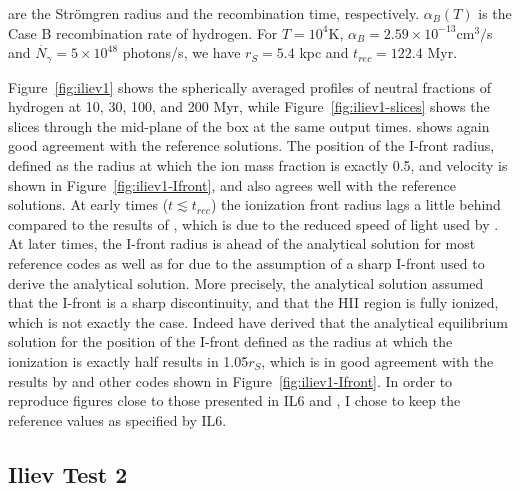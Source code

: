 are the Str\"omgren radius and the recombination time, respectively.
$\alpha_B(T)$ is the Case B recombination rate of hydrogen. For $T = 10^4$K, $\alpha_B =
2.59 \times 10^{-13}$cm$^3/$s and $\dot{N_\gamma} = 5 \times 10^{48}$ photons/s, we have $r_S =
5.4$ kpc and $t_{rec} = 122.4$ Myr.

Figure~\ref{fig:iliev1} shows the spherically averaged profiles of neutral fractions of hydrogen at
10, 30, 100, and 200 Myr, while Figure~\ref{fig:iliev1-slices} shows the slices through the
mid-plane of the box at the same output times. \GEARRT shows again good agreement with the reference
solutions. The position of the I-front radius, defined as the radius at which the ion mass fraction
is exactly 0.5, and velocity is shown in Figure~\ref{fig:iliev1-Ifront}, and also agrees well with
the reference solutions. At early times ($t \lesssim t_{rec}$) the ionization front radius lags a
little behind compared to the results of , which is due to the reduced speed of
light used by \GEARRT. At later times, the I-front radius is ahead of the analytical solution for
most reference codes as well as for \GEARRT due to the assumption of a sharp I-front used to derive
the analytical solution. More precisely, the analytical solution assumed that the I-front is a sharp
discontinuity, and that the HII region is fully ionized, which is not exactly the case.
Indeed \citet{pawlikTRAPHICRadiativeTransfer2008} have derived that the analytical equilibrium
solution for the position of the I-front defined as the radius at which the ionization is exactly
half results in 1.05$r_S$, which is in good agreement with the results by \GEARRT and other codes
shown in Figure~\ref{fig:iliev1-Ifront}. In order to reproduce figures close to those presented in
IL6 and \citet{ramses-rt13}, I chose to keep the reference values as specified by IL6.









\subsection{Iliev Test 2}\label{chap:Iliev2}



